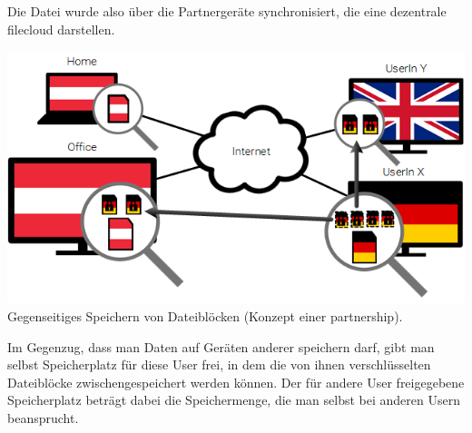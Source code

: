 Die Datei wurde also über die Partnergeräte synchronisiert, die eine dezentrale
\gls{filecloud} darstellen.

\includegraphics[]{images/sblit_3}
Gegenseitiges Speichern von Dateiblöcken (Konzept einer \gls{partnership}).

Im Gegenzug, dass man Daten auf Geräten anderer speichern darf, gibt man selbst
Speicherplatz für diese User frei, in dem die von ihnen verschlüsselten
Dateiblöcke zwischengespeichert werden können. Der für andere User freigegebene
Speicherplatz beträgt dabei die Speichermenge, die man selbst bei anderen Usern
beansprucht.
